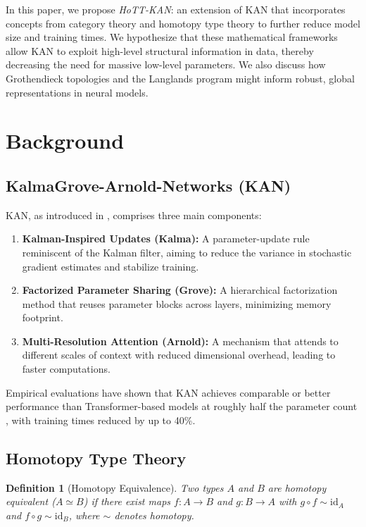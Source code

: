 \documentclass{article}
\newtheorem{definition}{Definition}[section]
\begin{document}
In this paper, we propose \emph{HoTT-KAN}: an extension of KAN that incorporates concepts from category theory and homotopy type theory to further reduce model size and training times. We hypothesize that these mathematical frameworks allow KAN to exploit high-level structural information in data, thereby decreasing the need for massive low-level parameters. We also discuss how Grothendieck topologies and the Langlands program might inform robust, global representations in neural models.

\section{Background}
\label{sec:background}

\subsection{KalmaGrove-Arnold-Networks (KAN)}
KAN, as introduced in \citet{KAN2024}, comprises three main components:
\begin{enumerate}
    \item \textbf{Kalman-Inspired Updates (Kalma):} A parameter-update rule reminiscent of the Kalman filter, aiming to reduce the variance in stochastic gradient estimates and stabilize training.
    \item \textbf{Factorized Parameter Sharing (Grove):} A hierarchical factorization method that reuses parameter blocks across layers, minimizing memory footprint.
    \item \textbf{Multi-Resolution Attention (Arnold):} A mechanism that attends to different scales of context with reduced dimensional overhead, leading to faster computations.
\end{enumerate}

Empirical evaluations have shown that KAN achieves comparable or better performance than Transformer-based models at roughly half the parameter count \citep{KAN2024}, with training times reduced by up to 40\%.

\subsection{Homotopy Type Theory}
\begin{definition}[Homotopy Equivalence]
Two types $A$ and $B$ are \emph{homotopy equivalent} ($A \simeq B$) if there exist maps $f:A \to B$ and $g:B \to A$ with $g \circ f \sim \text{id}_A$ and $f \circ g \sim \text{id}_B$, where $\sim$ denotes homotopy.
\end{definition}
\end{document}
